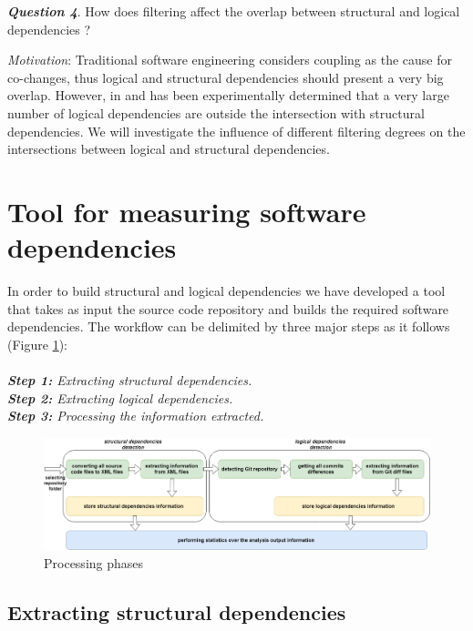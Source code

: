 \documentclass[a4paper,twoside]{article}
\begin{document}
\textit{\textbf{Question 4}}. How does filtering affect the overlap between structural and logical dependencies ? 

\textit{Motivation}: Traditional software engineering considers coupling as the cause for co-changes, thus logical and structural dependencies should present a very big overlap. However, in \cite{Oliva:2011:ISL:2067853.2068086} and \cite{DBLP:journals/jss/AjienkaC17} has been experimentally determined that a very large number of logical dependencies are outside the intersection with structural dependencies. We will investigate the influence of different filtering degrees on the intersections between logical and structural dependencies.  





\section{Tool for measuring software dependencies}
\label{sec:tool}

In order to build structural and logical dependencies we have developed a tool that takes as input the source code repository and builds the required software dependencies. The workflow can be delimited by three major steps as it follows (Figure \ref{fig:fig3}):\\ \\
\textit{\textbf{Step 1:} Extracting structural dependencies.}\\
\textit{\textbf{Step 2:} Extracting logical dependencies.}\\
\textit{\textbf{Step 3:} Processing the information extracted.}



\begin{figure}[htb]
\centering
\includegraphics[width=\textwidth]{fig3.png}
\caption{Processing phases}
\label{fig:fig3}
\end{figure}

\subsection{ Extracting structural dependencies}
\end{document}
